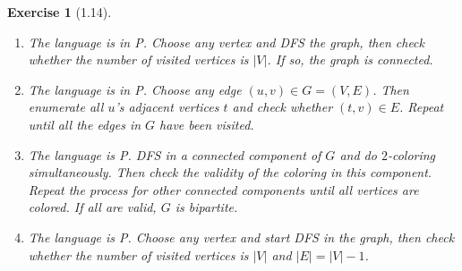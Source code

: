 \documentclass[a4paper]{article}
\newtheorem*{exercise}{Exercise}
\begin{document}
\begin{exercise}[1.14]
\begin{enumerate}		
	\item[\textbf{(a)}] 
		The language is in P.
		Choose any vertex and DFS the graph, then check whether the number of visited vertices is $|V|$. 
        If so, the graph is connected.
		\item[\textbf{(b)}] 
		The language is in P.
        Choose any edge $(u,v)\in G=(V,E)$. Then enumerate all $u$'s adjacent vertices $t$ and check whether $(t,v)\in E$. 
        Repeat until all the edges in $G$ have been visited.
		\item[\textbf{(c)}] 
		The language is P.
		DFS in a connected component of $G$ and do $2$-coloring simultaneously.
        Then check the validity of the coloring in this component. 
        Repeat the process for other connected components until all vertices are colored.
        If all are valid, $G$ is bipartite. 
		\item[\textbf{(d)}] 
		The language is P.
        Choose any vertex and start DFS in the graph, then
        check whether the number of visited vertices is $|V|$ and $|E|=|V|-1$.
\end{enumerate}
\end{exercise}
\end{document}
